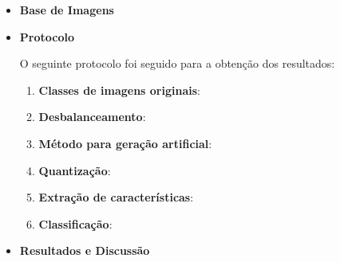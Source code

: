 \begin{itemize}
\item[] \textbf{Base de Imagens}


\item[] \textbf{Protocolo}

O seguinte protocolo foi seguido para a obtenção dos resultados:

\begin{enumerate}
\item \textbf{Classes de imagens originais}:
\item \textbf{Desbalanceamento}:
\item \textbf{Método para geração artificial}:
\item \textbf{Quantização}:
\item \textbf{Extração de características}:
\item \textbf{Classificação}:
\end{enumerate}
\item[] \textbf{Resultados e Discussão}

\end{itemize}



